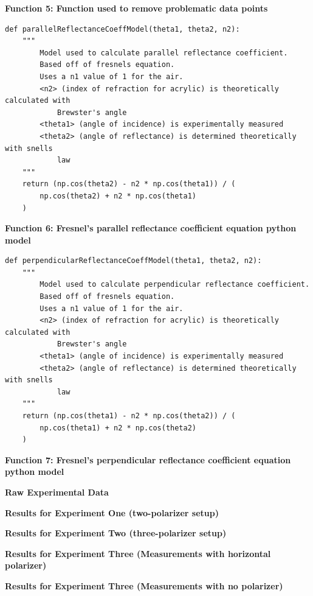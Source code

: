 \documentclass[
	letterpaper, %
	10pt, %
]{CSUniSchoolLabReport}
\begin{document}
\begin{center}
	\textbf{Function 5: Function used to remove problematic data points}
\end{center}


\begin{verbatim}
def parallelReflectanceCoeffModel(theta1, theta2, n2):
    """
        Model used to calculate parallel reflectance coefficient.
        Based off of fresnels equation.
        Uses a n1 value of 1 for the air.
        <n2> (index of refraction for acrylic) is theoretically calculated with
            Brewster's angle
        <theta1> (angle of incidence) is experimentally measured
        <theta2> (angle of reflectance) is determined theoretically with snells
            law
    """
    return (np.cos(theta2) - n2 * np.cos(theta1)) / (
        np.cos(theta2) + n2 * np.cos(theta1)
    )

\end{verbatim}
\begin{center}
	\textbf{Function 6: Fresnel's parallel reflectance coefficient equation python model}\\

\end{center}

\begin{verbatim}
def perpendicularReflectanceCoeffModel(theta1, theta2, n2):
    """
        Model used to calculate perpendicular reflectance coefficient.
        Based off of fresnels equation.
        Uses a n1 value of 1 for the air.
        <n2> (index of refraction for acrylic) is theoretically calculated with
            Brewster's angle
        <theta1> (angle of incidence) is experimentally measured
        <theta2> (angle of reflectance) is determined theoretically with snells
            law
    """
    return (np.cos(theta1) - n2 * np.cos(theta2)) / (
        np.cos(theta1) + n2 * np.cos(theta2)
    )
\end{verbatim}
\begin{center}
	\textbf{Function 7: Fresnel's perpendicular reflectance coefficient equation python model}
\end{center}
{\large\textbf{Raw Experimental Data}}\\
\begin{center}
	\textbf{Results for Experiment One (two-polarizer setup)}
\end{center}



\begin{center}
	\textbf{Results for Experiment Two (three-polarizer setup)}
\end{center}

\begin{center}
	\textbf{Results for Experiment Three (Measurements with horizontal polarizer)}
\end{center}

\begin{center}
	\textbf{Results for Experiment Three (Measurements with no polarizer)}
\end{center}
\end{document}
